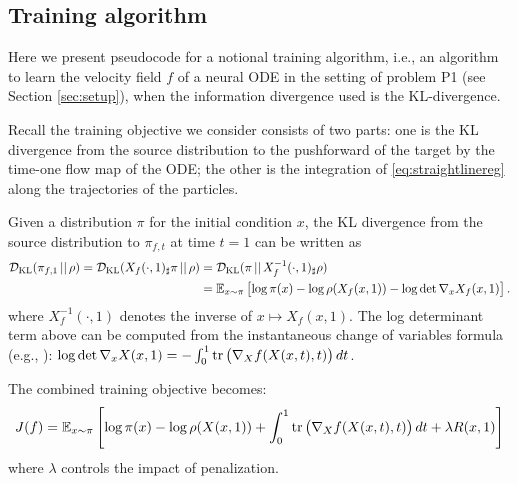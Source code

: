 \subsection{Training algorithm}

Here we present pseudocode for a notional training algorithm, i.e., an algorithm to learn the velocity field $f$ of a neural ODE in the setting of problem P1 (see Section \ref{sec:setup}), when the information divergence used is the KL-divergence. 

Recall the training objective we consider consists of two parts: one is the KL divergence from the source distribution to the pushforward of the target by the time-one flow map of the ODE; the other is the integration of \eqref{eq:straightlinereg} along the trajectories of
the particles.

Given a distribution $\pi$ for the initial condition $x$, 
the KL divergence from the source distribution to $\pi_{f,t}$ at time $t=1$ can be written as
\begin{align*}
    \mathcal{D}_{\rm KL}( \pi_{f,1} \, || \, \rho ) = \mathcal{D}_{\rm KL} ( X_f(\cdot, 1)_\sharp \pi \, || \, \rho )
    & = \mathcal{D}_{\rm KL} ( \pi \, || \, X_f^{-1}(\cdot, 1)_\sharp \rho ) \\
    & = \mathbb{E}_{x \sim \pi} \left [ \log \pi(x) - \log \rho ( X_f(x,1) ) - \log \det \nabla_x X_f(x,1) \right ].
\end{align*}
where $X_f^{-1}(\cdot, 1)$ denotes the inverse of $x \mapsto X_f(x,1)$. The log determinant term above can be computed from the
instantaneous change of variables formula (e.g., \citet{NeuralODE}): $\log \det \nabla_x X(x,1) = - \int_0^1 {\mathrm{tr}} \left ( \nabla_X f(X(x,t),t) \right ) dt$. 

The combined training objective becomes:
\begin{equation}\label{eq:OBJ}
  \begin{aligned}
    J(f) &= 
    \mathbb{E}_{x\sim\pi} \left [ \log\pi(x) 
    - \log\rho(X(x,1)) +  \int_0^1 {\mathrm{tr}} \left( \nabla_X f(X(x,t),t) \right) dt + \lambda R(x,1) \right ]\\
  \end{aligned}
\end{equation}
where $\lambda$ controls the impact of penalization.

